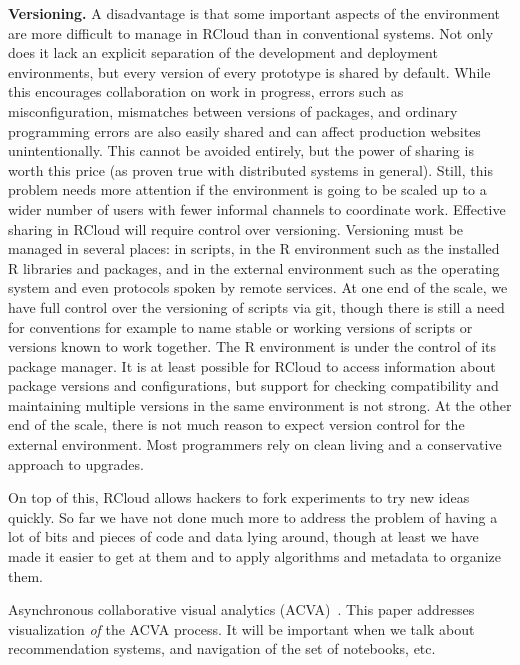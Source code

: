 {\bf Versioning.}
A disadvantage is that some important aspects of the environment
are more difficult to manage in RCloud than in conventional systems.
Not only does it lack an explicit separation of the development and
deployment environments, but every version of every prototype is
shared by default. While this encourages collaboration on work
in progress, errors such as misconfiguration, mismatches between
versions of packages, and ordinary programming errors are also
easily shared and can affect production websites unintentionally.
This cannot be avoided entirely, but the power of sharing is worth
this price (as proven true with distributed systems in general).
Still, this problem needs more attention if the environment is
going to be scaled up to a wider number of users with fewer
informal channels to coordinate work. Effective sharing in RCloud
will require control over versioning.
Versioning must be managed in several places: in scripts, in the R environment
such as the installed R libraries and packages, and in the external
environment such as the operating system and even protocols spoken by
remote services. At one end of the scale, we have full control over the
versioning of scripts via git, though there is still a need for conventions
for example to name stable or working versions of scripts or versions known
to work together. The R environment is under the control of its package
manager. It is at least possible for RCloud to access information about
package versions and configurations, but support for checking compatibility
and maintaining multiple versions in the same environment is not strong.
At the other end of the scale, there is not much reason to expect version
control for the external environment. Most programmers rely on clean living
and a conservative approach to upgrades.

On top of this, RCloud allows hackers to fork experiments to try
new ideas quickly. So far we have not done much more to address the
problem of having a lot of bits and pieces of code and data lying
around, though at least we have made it easier to get at them and
to apply algorithms and metadata to organize them.

Asynchronous collaborative visual analytics
(ACVA)~\cite{Chen:2011:SEC}. This paper addresses visualization
\emph{of} the ACVA process. It will be important when we talk about
recommendation systems, and navigation of the set of notebooks, etc.

